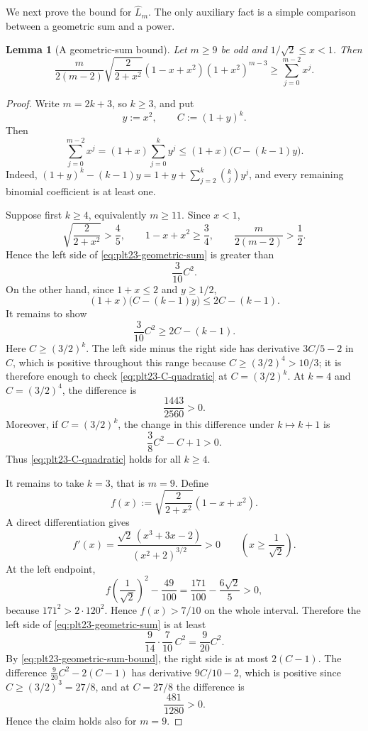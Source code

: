﻿\documentclass[11pt]{article}
\newtheorem{lemma}[theorem]{Lemma}
\numberwithin{equation}{section}
\begin{document}
We next prove the bound for $\widehat L_m$.
The only auxiliary fact is a simple comparison between a geometric sum and a power.

\begin{lemma}[A geometric-sum bound]\label{lem:plt23-geometric-sum}
  Let $m\ge9$ be odd and $1/\sqrt2\le x<1$.
  Then
  \begin{equation}\label{eq:plt23-geometric-sum}
    \frac{m}{2(m-2)}
    \sqrt{\frac2{2+x^2}}
    (1-x+x^2)(1+x^2)^{m-3}
    \ge
    \sum_{j=0}^{m-2} x^j.
  \end{equation}
\end{lemma}

\begin{proof}
  Write $m=2k+3$, so $k\ge3$, and put
  \[
    y:=x^2,
    \qquad
    C:=(1+y)^k.
  \]
  Then
  \begin{equation}\label{eq:plt23-geometric-sum-bound}
    \sum_{j=0}^{m-2} x^j
    =(1+x)\sum_{j=0}^k y^j
    \le (1+x)\bigl(C-(k-1)y\bigr).
  \end{equation}
  Indeed, $(1+y)^k-(k-1)y=1+y+\sum_{j=2}^k\binom{k}{j}y^j$, and every remaining binomial coefficient is at least one.

  Suppose first $k\ge4$, equivalently $m\ge11$.
  Since $x<1$,
  \[
    \sqrt{\frac2{2+x^2}}>\frac45,
    \qquad
    1-x+x^2\ge\frac34,
    \qquad
    \frac{m}{2(m-2)}>\frac12.
  \]
  Hence the left side of \eqref{eq:plt23-geometric-sum} is greater than
  \[
    \frac3{10}C^2.
  \]
  On the other hand, since $1+x\le2$ and $y\ge1/2$,
  \[
    (1+x)\bigl(C-(k-1)y\bigr)
    \le2C-(k-1).
  \]
  It remains to show
  \begin{equation}\label{eq:plt23-C-quadratic}
    \frac3{10}C^2\ge2C-(k-1).
  \end{equation}
  Here $C\ge(3/2)^k$.
  The left side minus the right side has derivative $3C/5-2$ in $C$, which is positive throughout this range because $C\ge(3/2)^4>10/3$; it is therefore enough to check \eqref{eq:plt23-C-quadratic} at $C=(3/2)^k$.
  At $k=4$ and $C=(3/2)^4$, the difference is
  \[
    \frac{1443}{2560}>0.
  \]
  Moreover, if $C=(3/2)^k$, the change in this difference under $k\mapsto k+1$ is
  \[
    \frac38C^2-C+1>0.
  \]
  Thus \eqref{eq:plt23-C-quadratic} holds for all $k\ge4$.

  It remains to take $k=3$, that is $m=9$.
  Define
  \[
    f(x):=\sqrt{\frac2{2+x^2}}(1-x+x^2).
  \]
  A direct differentiation gives
  \[
    f'(x)
    =\frac{\sqrt2\,(x^3+3x-2)}{(x^2+2)^{3/2}}>0
    \qquad\left(x\ge\frac1{\sqrt2}\right).
  \]
  At the left endpoint,
  \[
    f\left(\frac1{\sqrt2}\right)^2-\frac{49}{100}
    =\frac{171}{100}-\frac{6\sqrt2}{5}>0,
  \]
  because $171^2>2\cdot120^2$.
  Hence $f(x)>7/10$ on the whole interval.
  Therefore the left side of \eqref{eq:plt23-geometric-sum} is at least
  \[
    \frac9{14}\cdot\frac7{10}\,C^2
    =\frac9{20}C^2.
  \]
  By \eqref{eq:plt23-geometric-sum-bound}, the right side is at most $2(C-1)$.
  The difference $\frac9{20}C^2-2(C-1)$ has derivative $9C/10-2$, which is positive since $C\ge(3/2)^3=27/8$, and at $C=27/8$ the difference is
  \[
    \frac{481}{1280}>0.
  \]
  Hence the claim holds also for $m=9$.
\end{proof}
\end{document}
